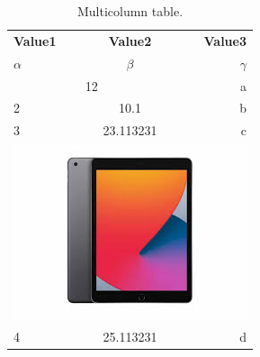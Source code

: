\documentclass{article}
\begin{document}
	 \begin{table}
	 	\begin{center}
	 		\caption{Multicolumn table.}
	 		\label{tab:table1}
	 		\begin{tabular}{l|c|r}
	 			\hline
	 			\textbf{Value1} & \textbf{Value2} & \textbf{Value3}\\
	 			$\alpha$ & $\beta$ & $\gamma$ \\
	 			\hline
	 			\multicolumn{2}{|c|}{12} & a\\
	 			\hline
	 			2& 10.1 & b\\
	 			3 & 23.113231 & c\\
	 			\hline
	 			\multicolumn{3}{c}{\includegraphics[width=0.15\linewidth]{image}}\\
	 			\hline
	 			4& 25.113231& d\\
	 			\hline
	 		\end{tabular}
	 	\end{center}
	 \end{table}
\end{document}

